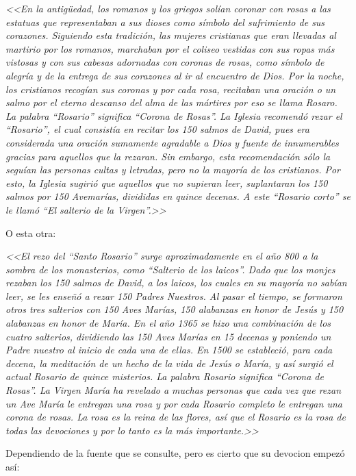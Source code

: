 \documentclass[12pt, letterpaper]{report}
\begin{document}
    \Large \textit{<<En la antigüedad, los romanos y los griegos solían coronar con rosas a las estatuas que representaban a sus dioses como símbolo del sufrimiento de sus corazones. Siguiendo esta tradición, las mujeres cristianas que eran llevadas al martirio por los romanos, marchaban por el coliseo vestidas con sus ropas más vistosas y con sus cabesas adornadas con coronas de rosas, como símbolo de alegría y de la entrega de sus corazones al ir al encuentro de Dios. Por la noche, los cristianos recogían sus coronas y por cada rosa, recitaban una oración o un salmo por el eterno descanso del alma de las mártires por eso se llama Rosaro. La palabra ``Rosario'' significa ``Corona de Rosas''. La Iglesia recomendó rezar el ``Rosario'', el cual consistía en recitar los 150 salmos de David, pues era considerada una oración sumamente agradable a Dios y fuente de innumerables gracias para aquellos que la rezaran. Sin embargo, esta recomendación sólo la seguían las personas cultas y letradas, pero no la mayoría de los cristianos. Por esto, la Iglesia sugirió que aquellos que no supieran leer, suplantaran los 150 salmos por 150 Avemarías, divididas en quince decenas. A este ``Rosario corto'' se le llamó ``El salterio de la Virgen''.>>} \cite{RorasioCatholicNet}
    
    \Large O esta otra:
    
    \Large \textit{<<El rezo del ``Santo Rosario'' surge aproximadamente en el año 800 a la sombra de los monasterios, como ``Salterio de los laicos''. Dado que los monjes rezaban los 150 salmos de David, a los laicos, los cuales en su mayoría no sabían leer, se les enseñó a rezar 150 Padres Nuestros. Al pasar el tiempo, se formaron otros tres salterios con 150 Aves Marías, 150 alabanzas en honor de Jesús y 150 alabanzas en honor de María. En el año 1365 se hizo una combinación de los cuatro salterios, dividiendo las 150 Aves Marías en 15 decenas y poniendo un Padre nuestro al inicio de cada una de ellas. En 1500 se estableció, para cada decena, la meditación de un hecho de la vida de Jesús o María, y así surgió el actual Rosario de quince misterios. La palabra Rosario significa ``Corona de Rosas''. La Virgen María ha revelado a muchas personas que cada vez que rezan un Ave María le entregan una rosa y por cada Rosario completo le entregan una corona de rosas. La rosa es la reina de las flores, así que el Rosario es la rosa de todas las devociones y por lo tanto es la más importante.>>}\cite{AciPrensaRosario}
    
    \Large Dependiendo de la fuente que se consulte, pero es cierto que su devocion empezó así:
    
\end{document}
